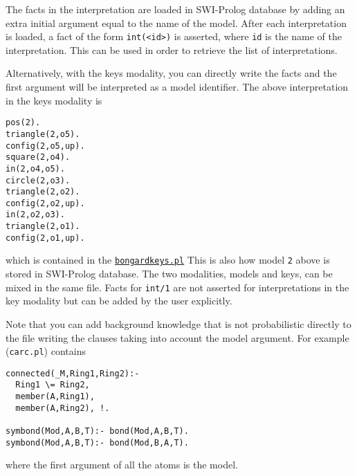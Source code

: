 The facts in the interpretation are loaded in SWI-Prolog database by adding an extra initial argument equal to the name of the model.
After each interpretation is loaded, a fact of the form \verb|int(<id>)| is asserted, where \verb|id| is the name of the interpretation. This can be used in
order to retrieve the list of interpretations.

Alternatively, with the keys modality, you can directly write the facts and the first argument will be interpreted as a model identifier. The above interpretation in the keys modality is
\begin{verbatim}
pos(2).
triangle(2,o5).
config(2,o5,up).
square(2,o4).
in(2,o4,o5).
circle(2,o3).
triangle(2,o2).
config(2,o2,up).
in(2,o2,o3).
triangle(2,o1).
config(2,o1,up).
\end{verbatim}
which is contained in the \href{http://cplint.eu/example/learning/bongardkeys.pl}{\texttt{bongardkeys.pl}}
This is also how model \verb|2| above is stored in SWI-Prolog database.
The two modalities, models and keys, can be mixed in the same file.
Facts for \verb|int/1| are not asserted for interpretations in the key
modality but can be added by the user explicitly.


Note that you can add background knowledge that is not probabilistic directly to the file writing the clauses taking into account the model argument. For example (\texttt{carc.pl})
contains
\begin{verbatim}
connected(_M,Ring1,Ring2):-
  Ring1 \= Ring2,
  member(A,Ring1),
  member(A,Ring2), !.

symbond(Mod,A,B,T):- bond(Mod,A,B,T).
symbond(Mod,A,B,T):- bond(Mod,B,A,T).
\end{verbatim}
where the first argument of all the atoms is the model.

